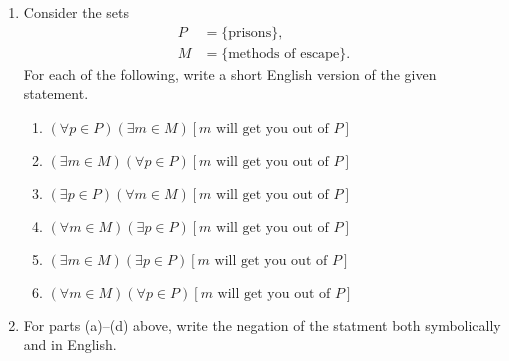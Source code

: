 \begin{enumerate}
\item Consider the sets 
\begin{align*}
P&=\{\text{prisons}\},\\
M&=\{\text{methods of escape}\}.
\end{align*}
For each of the following, write a short English version of the given
statement.
 \begin{enumerate}
 \item $(\forall p\in P)(\exists m\in M)[m\text{ will get you out of }P]$ 
 \item $(\exists m\in M)(\forall p\in P)[m\text{ will get you out of }P]$
 \item $(\exists p\in P)(\forall m\in M)[m\text{ will get you out of }P]$
 \item $(\forall m\in M)(\exists p\in P)[m\text{ will get you out of }P]$
 \item $(\exists m\in M)(\exists p\in P)[m\text{ will get you out of }P]$
 \item $(\forall m\in M)(\forall p\in P)[m\text{ will get you out of }P]$
 \end{enumerate}

\item For parts (a)--(d) above, write the negation of the statment
both symbolically and in English.


\end{enumerate}
